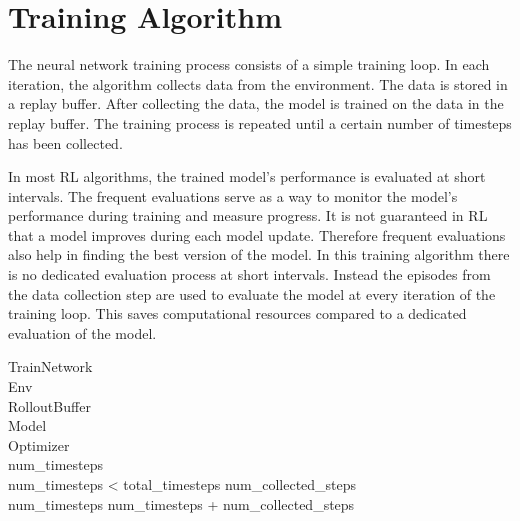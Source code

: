 \section{Training Algorithm}



The neural network training process consists of a simple training loop. In each iteration, the algorithm collects data from the environment. The data is stored in a replay buffer. After collecting the data, the model is trained on the data in the replay buffer. The training process is repeated until a certain number of timesteps has been collected.  

In most \ac{RL} algorithms, the trained model's performance is evaluated at short intervals. The frequent evaluations serve as a way to monitor the model's performance during training and measure progress. It is not guaranteed in \ac{RL} that a model improves during each model update. Therefore frequent evaluations also help in finding the best version of the model.  
In this training algorithm there is no dedicated evaluation process at short intervals. Instead the episodes from the data collection step are used to evaluate the model at every iteration of the training loop. This saves computational resources compared to a dedicated evaluation of the model.

\renewcommand{\thepseudonum}{\roman{pseudonum}}
\begin{pseudocode}{TrainNetwork}{ }
\label{train_network}
\\

\MAIN
Env \GETS {}\\
RolloutBuffer \GETS {}\\
Model \GETS {}\\
Optimizer \GETS {}\\

num\_timesteps \\
\WHILE num\_timesteps < total\_timesteps \DO 
\BEGIN 
num\_collected\_steps \GETS {}\\
num\_timesteps \GETS num\_timesteps + num\_collected\_steps\\
\\
\END\\
\ENDMAIN
\end{pseudocode}

